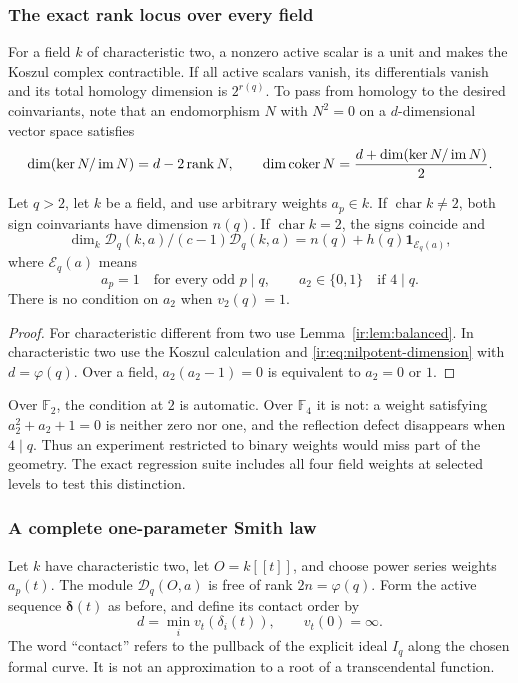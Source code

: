 \subsubsection{The exact rank locus over every field}
For a field $k$ of characteristic two, a nonzero active scalar is a
unit and makes the Koszul complex contractible. If all active scalars
vanish, its differentials vanish and its total homology dimension is
$2^{r(q)}$. To pass from homology to the desired coinvariants, note
that an endomorphism $N$ with $N^2=0$ on a $d$-dimensional vector
space satisfies
\begin{equation}\label{ir:eq:nilpotent-dimension}
 \dim(\ker N/\operatorname{im} N)=d-2\operatorname{rank} N,
 \qquad
 \dim\operatorname{coker} N=\frac{d+\dim(\ker N/\operatorname{im} N)}2.
\end{equation}

\begin{theorem}
\label{ir:thm:field-locus}
Let $q>2$, let $k$ be a field, and use arbitrary weights $a_p\in k$.
If $\operatorname{char}k\ne2$, both sign coinvariants have dimension
$n(q)$. If $\operatorname{char}k=2$, the signs coincide and
\begin{equation}\label{ir:eq:field-locus}
 \dim_k\mathcal D_q(k,a)/(c-1)\mathcal D_q(k,a)
 =n(q)+h(q)\mathbf 1_{\mathcal E_q(a)},
\end{equation}
where $\mathcal E_q(a)$ means
\[
 a_p=1\quad\text{for every odd }p\mid q,
 \qquad a_2\in\{0,1\}\quad\text{if }4\mid q.
\]
There is no condition on $a_2$ when $v_2(q)=1$.
\end{theorem}
\begin{proof}
For characteristic different from two use
Lemma~\ref{ir:lem:balanced}. In characteristic two use the Koszul
calculation and \eqref{ir:eq:nilpotent-dimension} with
$d=\varphi(q)$. Over a field, $a_2(a_2-1)=0$ is equivalent to
$a_2=0$ or $1$.
\end{proof}

Over $\mathbb F_2$, the condition at $2$ is automatic. Over $\mathbb F_4$ it is
not: a weight satisfying $a_2^2+a_2+1=0$ is neither zero nor one,
and the reflection defect disappears when $4\mid q$. Thus an
experiment restricted to binary weights would miss part of the
geometry. The exact regression suite includes all four field
weights at selected levels to test this distinction.

\subsubsection{A complete one-parameter Smith law}
Let $k$ have characteristic two, let $O=k[[t]]$, and choose power
series weights $a_p(t)$. The module $\mathcal D_q(O,a)$ is free of rank
$2n=\varphi(q)$. Form the active sequence $\boldsymbol\delta(t)$
as before, and define its contact order by
\begin{equation}\label{ir:eq:contact-order}
 d=\min_i v_t(\delta_i(t)),\qquad v_t(0)=\infty.
\end{equation}
The word ``contact'' refers to the pullback of the explicit ideal
$I_q$ along the chosen formal curve. It is not an approximation to a
root of a transcendental function.

